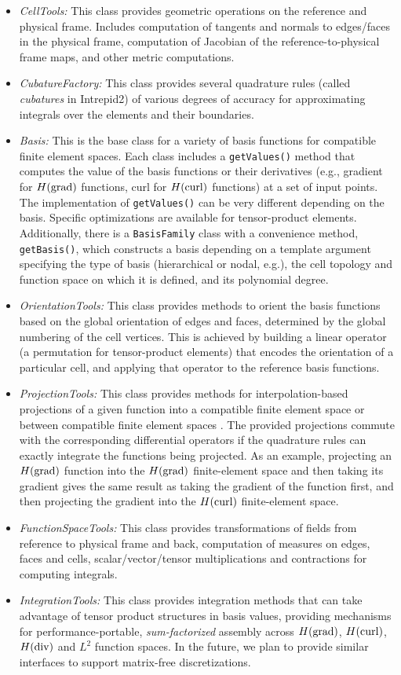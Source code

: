 \begin{itemize}
\item \emph{CellTools:} This class provides geometric operations on the reference and physical frame. Includes computation of tangents and normals to edges/faces in the physical frame, computation of Jacobian of the reference-to-physical frame maps, and other metric computations. 
\item \emph{CubatureFactory:} This class provides several quadrature rules (called \emph{cubatures} in Intrepid2) of various degrees of accuracy for approximating integrals over the elements and their boundaries.
\item \emph{Basis:} This is the base class for a variety of basis functions for compatible finite element spaces. Each class includes a \texttt{getValues()} method that computes the value of the basis functions or their derivatives (e.g., gradient for $H({\rm grad})$ functions, curl for $H({\rm curl})$ functions) at a set of input points. The implementation of \texttt{getValues()} can be very different depending on the basis. Specific optimizations are available for tensor-product elements.  Additionally, there is a \texttt{BasisFamily} class with a convenience method, \texttt{getBasis()}, which constructs a basis depending on a template argument specifying the type of basis (hierarchical or nodal, e.g.), the cell topology and function space on which it is defined, and its polynomial degree.
\item \emph{OrientationTools:} This class provides methods to orient the basis functions based on the global orientation of edges and faces, determined by the global numbering of the cell vertices. This is achieved by building a linear operator (a permutation for tensor-product elements) that encodes the orientation of a particular cell, and applying that operator to the reference basis functions.
\item \emph{ProjectionTools:} This class provides methods for interpolation-based projections of a given function into a compatible finite element space or between compatible finite element spaces \cite{demkowicz2007}.  The provided projections commute with the corresponding differential operators if the quadrature rules can exactly integrate the functions being projected. As an example, projecting an $H({\rm grad})$ function into the $H({\rm grad})$ finite-element space and then taking its gradient gives the same result as taking the gradient of the function first, and then projecting the gradient into the $H({\rm curl})$ finite-element space.
\item \emph{FunctionSpaceTools:} This class provides transformations of fields from reference to physical frame and back, computation of measures on edges, faces and cells, scalar/vector/tensor multiplications and contractions for computing integrals.
\item \emph{IntegrationTools:} This class provides integration methods that can take advantage of tensor product structures in basis values, providing mechanisms for performance-portable, \emph{sum-factorized} assembly across $H({\rm grad})$, $H({\rm curl})$, $H({\rm div})$ and $L^2$ function spaces.  In the future, we plan to provide similar interfaces to support matrix-free discretizations.
\end{itemize}
